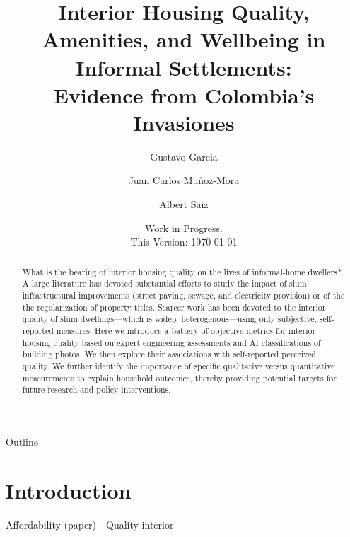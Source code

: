    

    \usepackage{booktabs}%
    \newcommand{\tabitem}{~~\llap{\textbullet}~~}

    \title{Interior Housing Quality, Amenities, and Wellbeing in Informal Settlements:  \\ 
    Evidence from Colombia's Invasiones}
    
    \author[1]{Gustavo Garcia}
    \author[1]{Juan Carlos Muñoz-Mora}
    \author[2]{Albert Saiz}


    \date{Work in Progress. \\ This Version: \today}

\usepackage{graphicx}

   


    \maketitle
        \begin{abstract}
    What is the bearing of interior housing quality on the lives of informal-home dwellers? A large literature has devoted substantial efforts to study the impact of slum infrastructural improvements (street paving, sewage, and electricity provision) or of the the regularization of property titles. Scarcer work has been devoted to the interior quality of slum dwellings—which is widely heterogenous—using only subjective, self-reported measures. Here we introduce a battery of objective metrics for interior housing quality based on expert engineering assessments and AI classifications of building photos. We then explore their associations with self-reported perceived quality. We further identify the importance of specific qualitative versus quantitative measurements to explain household outcomes, thereby providing potential targets for future research and policy interventions.
        \end{abstract}

Outline

\section{Introduction}

Affordability (paper) - Quality interior

